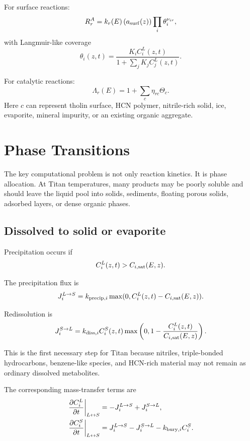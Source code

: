 \documentclass[11pt]{article}
\begin{document}
For surface reactions:
\begin{equation}
R_r^A
=
k_r(E)
\left(a_{\rm surf}(z)\right)
\prod_i \theta_i^{\nu_{ir}},
\end{equation}
with Langmuir-like coverage
\begin{equation}
\theta_i(z,t)
=
\frac{K_i C_i^L(z,t)}{1+\sum_j K_j C_j^L(z,t)}.
\end{equation}

For catalytic reactions:
\begin{equation}
\Lambda_r(E)
=
1+\sum_c \eta_{rc}\Theta_c.
\end{equation}
Here $c$ can represent tholin surface, HCN polymer, nitrile-rich solid, ice, evaporite, mineral impurity, or an existing organic aggregate.

\section{Phase Transitions}

The key computational problem is not only reaction kinetics. It is phase allocation. At Titan temperatures, many products may be poorly soluble and should leave the liquid pool into solids, sediments, floating porous solids, adsorbed layers, or dense organic phases.

\subsection{Dissolved to solid or evaporite}

Precipitation occurs if
\begin{equation}
C_i^L(z,t) > C_{i,\rm sat}(E,z).
\end{equation}

The precipitation flux is
\begin{equation}
J_i^{L\rightarrow S}
=
k_{{\rm precip},i}
\max(0,C_i^L(z,t)-C_{i,\rm sat}(E,z)).
\end{equation}

Redissolution is
\begin{equation}
J_i^{S\rightarrow L}
=
k_{{\rm diss},i} C_i^S(z,t)
\max\left(0,1-\frac{C_i^L(z,t)}{C_{i,\rm sat}(E,z)}\right).
\end{equation}

This is the first necessary step for Titan because nitriles, triple-bonded hydrocarbons, benzene-like species, and HCN-rich material may not remain as ordinary dissolved metabolites.

The corresponding mass-transfer terms are
\begin{align}
\left.\frac{\partial C_i^L}{\partial t}\right|_{L\leftrightarrow S}
&=
-J_i^{L\rightarrow S}+J_i^{S\rightarrow L},\\
\left.\frac{\partial C_i^S}{\partial t}\right|_{L\leftrightarrow S}
&=
J_i^{L\rightarrow S}-J_i^{S\rightarrow L}-k_{{\rm bury},i}C_i^S.
\end{align}
\end{document}
